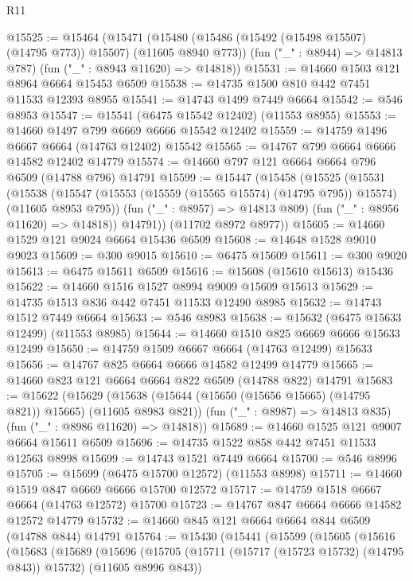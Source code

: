 \begin{lexlean}{R11}
\begin{coremodule}
@15525 := @15464
    (@15471
      (@15480 (@15486 (@15492 (@15498 @15507) (@14795 @773)) @15507) (@11605 @8940 @773))
      (fun ("_" : @8944) => @14813 @787)
      (fun ("_" : @8943 @11620) => @14818))
@15531 := @14660 @1503 @121 @8964 @6664 @15453 @6509
@15538 := @14735 @1500 @810 @442 @7451 @11533 @12393 @8955
@15541 := @14743 @1499 @7449 @6664
@15542 := @546 @8953
@15547 := @15541 (@6475 @15542 @12402) (@11553 @8955)
@15553 := @14660 @1497 @799 @6669 @6666 @15542 @12402
@15559 := @14759 @1496 @6667 @6664 (@14763 @12402) @15542
@15565 := @14767 @799 @6664 @6666 @14582 @12402 @14779
@15574 := @14660 @797 @121 @6664 @6664 @796 @6509 (@14788 @796) @14791
@15599 := @15447
    (@15458
      (@15525
        (@15531
          (@15538
            (@15547 (@15553 (@15559 (@15565 @15574) (@14795 @795)) @15574) (@11605 @8953 @795))
            (fun ("_" : @8957) => @14813 @809)
            (fun ("_" : @8956 @11620) => @14818))
          @14791))
      (@11702 @8972 @8977))
@15605 := @14660 @1529 @121 @9024 @6664 @15436 @6509
@15608 := @14648 @1528 @9010 @9023
@15609 := @300 @9015
@15610 := @6475 @15609
@15611 := @300 @9020
@15613 := @6475 @15611 @6509
@15616 := @15608 (@15610 @15613) @15436
@15622 := @14660 @1516 @1527 @8994 @9009 @15609 @15613
@15629 := @14735 @1513 @836 @442 @7451 @11533 @12490 @8985
@15632 := @14743 @1512 @7449 @6664
@15633 := @546 @8983
@15638 := @15632 (@6475 @15633 @12499) (@11553 @8985)
@15644 := @14660 @1510 @825 @6669 @6666 @15633 @12499
@15650 := @14759 @1509 @6667 @6664 (@14763 @12499) @15633
@15656 := @14767 @825 @6664 @6666 @14582 @12499 @14779
@15665 := @14660 @823 @121 @6664 @6664 @822 @6509 (@14788 @822) @14791
@15683 := @15622
    (@15629
      (@15638 (@15644 (@15650 (@15656 @15665) (@14795 @821)) @15665) (@11605 @8983 @821))
      (fun ("_" : @8987) => @14813 @835)
      (fun ("_" : @8986 @11620) => @14818))
@15689 := @14660 @1525 @121 @9007 @6664 @15611 @6509
@15696 := @14735 @1522 @858 @442 @7451 @11533 @12563 @8998
@15699 := @14743 @1521 @7449 @6664
@15700 := @546 @8996
@15705 := @15699 (@6475 @15700 @12572) (@11553 @8998)
@15711 := @14660 @1519 @847 @6669 @6666 @15700 @12572
@15717 := @14759 @1518 @6667 @6664 (@14763 @12572) @15700
@15723 := @14767 @847 @6664 @6666 @14582 @12572 @14779
@15732 := @14660 @845 @121 @6664 @6664 @844 @6509 (@14788 @844) @14791
@15764 := @15430
    (@15441
      (@15599
        (@15605
          (@15616
            (@15683
              (@15689
                (@15696
                  (@15705
                    (@15711 (@15717 (@15723 @15732) (@14795 @843)) @15732)
                    (@11605 @8996 @843))

\end{coremodule}
\end{lexlean}
